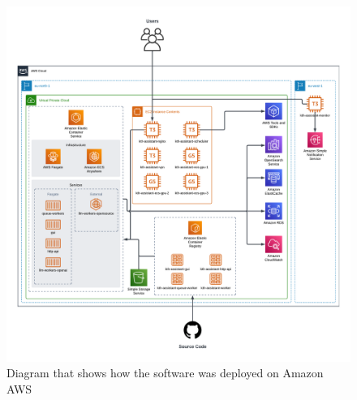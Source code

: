 
\begin{figure}[H]
    \centering
    \includegraphics[width=\textwidth]{content/figures/assets/07-aws-diagram.pdf}
    \caption{Diagram that shows how the software was deployed on Amazon AWS}
    \label{fig:aws_diagram}
\end{figure}
